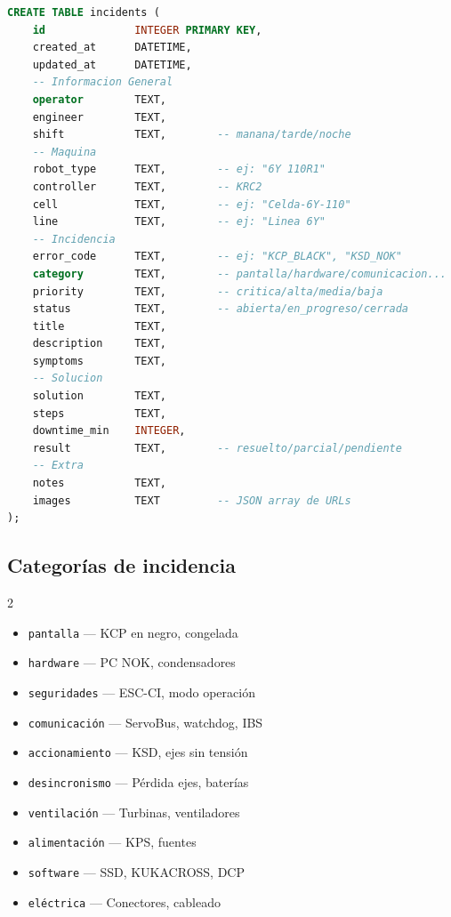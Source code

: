 \documentclass[11pt,a4paper]{article}
\begin{document}
\begin{lstlisting}[language=SQL]
CREATE TABLE incidents (
    id              INTEGER PRIMARY KEY,
    created_at      DATETIME,
    updated_at      DATETIME,
    -- Informacion General
    operator        TEXT,
    engineer        TEXT,
    shift           TEXT,        -- manana/tarde/noche
    -- Maquina
    robot_type      TEXT,        -- ej: "6Y 110R1"
    controller      TEXT,        -- KRC2
    cell            TEXT,        -- ej: "Celda-6Y-110"
    line            TEXT,        -- ej: "Linea 6Y"
    -- Incidencia
    error_code      TEXT,        -- ej: "KCP_BLACK", "KSD_NOK"
    category        TEXT,        -- pantalla/hardware/comunicacion...
    priority        TEXT,        -- critica/alta/media/baja
    status          TEXT,        -- abierta/en_progreso/cerrada
    title           TEXT,
    description     TEXT,
    symptoms        TEXT,
    -- Solucion
    solution        TEXT,
    steps           TEXT,
    downtime_min    INTEGER,
    result          TEXT,        -- resuelto/parcial/pendiente
    -- Extra
    notes           TEXT,
    images          TEXT         -- JSON array de URLs
);
\end{lstlisting}

\subsection{Categorías de incidencia}

\begin{multicols}{2}
\begin{itemize}[noitemsep]
    \item \texttt{pantalla} --- KCP en negro, congelada
    \item \texttt{hardware} --- PC NOK, condensadores
    \item \texttt{seguridades} --- ESC-CI, modo operación
    \item \texttt{comunicación} --- ServoBus, watchdog, IBS
    \item \texttt{accionamiento} --- KSD, ejes sin tensión
    \item \texttt{desincronismo} --- Pérdida ejes, baterías
    \item \texttt{ventilación} --- Turbinas, ventiladores
    \item \texttt{alimentación} --- KPS, fuentes
    \item \texttt{software} --- SSD, KUKACROSS, DCP
    \item \texttt{eléctrica} --- Conectores, cableado
\end{itemize}
\end{multicols}
\end{document}
